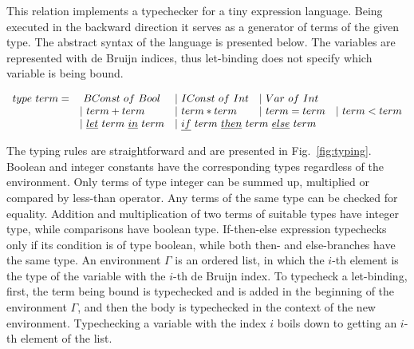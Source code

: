 This relation implements a typechecker for a tiny expression language.
Being executed in the backward direction it serves as a generator of terms of the given type.
The abstract syntax of the language is presented below.
The variables are represented with de Bruijn indices, thus let-binding does not specify which variable is being bound.

\[\begin{array}{lllll}
  type \ term = &\ BConst \ of \ Bool &| \ IConst \ of \ Int &| \ Var \ of \ Int & \\
  & | \ term + term &| \ term * term &| \ term = term &| \ term < term \\
  &| \ \underline{let} \ term \ \underline{in} \ term
  &\multicolumn{2}{l}{| \ \underline{if} \ term \ \underline{then} \ term \ \underline{else} \ term} &
\end{array}\]

The typing rules are straightforward and are presented in Fig.~\ref{fig:typing}.
Boolean and integer constants have the corresponding types regardless of the environment.
Only terms of type integer can be summed up, multiplied or compared by less-than operator.
Any terms of the same type can be checked for equality.
Addition and multiplication of two terms of suitable types have integer type, while comparisons have boolean type.
If-then-else expression typechecks only if its condition is of type boolean, while both then- and else-branches have the same type.
An environment $\Gamma$ is an ordered list, in which the $i$-th element is the type of the variable with the $i$-th de Bruijn index.
To typecheck a let-binding, first, the term being bound is typechecked and is added in the beginning of the environment $\Gamma$, and then the body is typechecked in the context of the new environment.
Typechecking a variable with the index $i$ boils down to getting an $i$-th element of the list.

